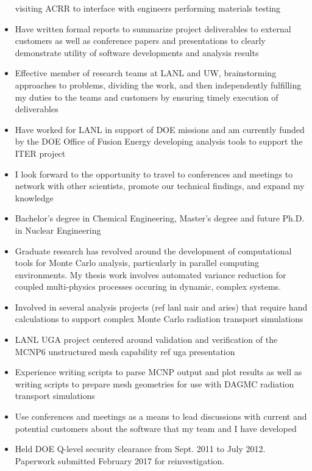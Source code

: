 \documentclass[a4paper,10pt]{article}
\begin{document}
\begin{itemize}[leftmargin=.9in,rightmargin=.875in,itemsep=1.6mm]
			visiting ACRR to interface with engineers performing
			materials testing
		\item Have written formal reports to summarize project
			deliverables to external customers as well as conference
			papers and presentations to clearly demonstrate
			utility of software
			developments and analysis results
		\item Effective member of research teams at LANL and
			UW, brainstorming approaches to problems, dividing the
			work, and then independently fulfilling my duties to the teams and
			customers by ensuring timely execution of deliverables
		\item  Have worked for LANL in support of DOE missions and am
			currently funded by the DOE Office of Fusion Energy
			developing analysis tools to support the ITER project 
		\item I look forward to the opportunity to travel to
			conferences and meetings to network with other
			scientists, promote our technical
			findings, and expand my knowledge
               \item Bachelor's degree in Chemical Engineering, Master's degree
		       and future Ph.D. in Nuclear Engineering
	       \item Graduate research has revolved around the development of
		       computational tools for Monte Carlo analysis,
		       particularly in parallel computing environments.  My
		       thesis work involves automated variance reduction for
		       coupled multi-physics processes occuring in dynamic, complex
		       systems.
	       \item Involved in several analysis projects (ref lanl
			       nair and aries) that require
			      hand calculations to support complex Monte
			      Carlo radiation transport simulations
	       \item LANL UGA project centered around validation and
		       verification of the MCNP6 unstructured mesh
		       capability ref uga presentation
	       \item Experience writing scripts to parse MCNP output
	               and plot results as well as writing scripts to
		       prepare mesh geometries for use with DAGMC
		       radiation transport simulations
	       \item Use conferences and meetings as a means to lead
		       discussions with current and potential customers about
		       the software that my team and I have developed
              \item Held DOE Q-level security clearance from Sept. 2011 to July
		      2012. Paperwork submitted February 2017 for
		      reinvestigation.


\end{itemize} 
\end{document}
